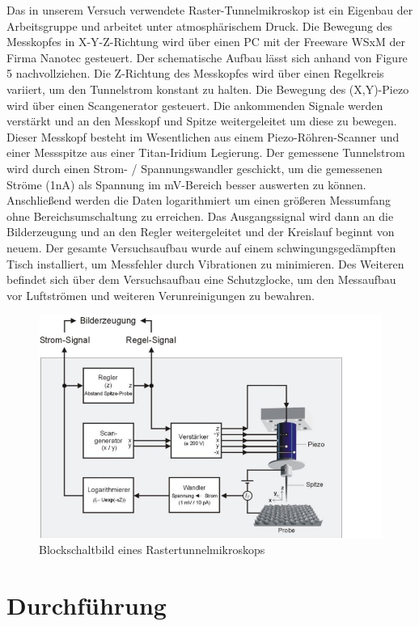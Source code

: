 \documentclass[10pt,a4paper]{article}
\begin{document}
	Das in unserem Versuch verwendete Raster-Tunnelmikroskop ist ein Eigenbau der Arbeitsgruppe und arbeitet unter atmosphärischem Druck. Die Bewegung des Messkopfes in X-Y-Z-Richtung wird über einen PC mit der Freeware WSxM der Firma Nanotec gesteuert.  Der schematische Aufbau lässt sich anhand von Figure 5 nachvollziehen.  Die Z-Richtung des Messkopfes wird über einen Regelkreis variiert, um den Tunnelstrom konstant zu halten. Die Bewegung des (X,Y)-Piezo wird über einen Scangenerator gesteuert. Die ankommenden Signale werden verstärkt und an den Messkopf und Spitze weitergeleitet um diese zu bewegen.  Dieser Messkopf besteht im Wesentlichen aus einem Piezo-Röhren-Scanner und einer Messspitze aus einer Titan-Iridium Legierung. Der gemessene Tunnelstrom wird durch einen Strom- / Spannungswandler geschickt, um die gemessenen Ströme (1nA) als Spannung im mV-Bereich besser auswerten zu können. Anschließend werden die Daten logarithmiert um einen größeren Messumfang ohne Bereichsumschaltung zu erreichen. Das Ausgangssignal wird dann an die Bilderzeugung und an den Regler weitergeleitet und der Kreislauf beginnt von neuem. Der gesamte Versuchsaufbau wurde auf einem schwingungsgedämpften Tisch installiert, um Messfehler durch Vibrationen zu minimieren. Des Weiteren befindet sich über dem Versuchsaufbau eine Schutzglocke, um den Messaufbau vor Luftströmen und weiteren Verunreinigungen zu bewahren.
	
	\begin{figure}[h]
		\includegraphics[scale = 0.6]{aufbau.png}
		\centering
		\caption{Blockschaltbild eines Rastertunnelmikroskops}
		\label{diagramm_aufspaltung}
	\end{figure}
	
	\section{Durchführung}
	
\end{document}
